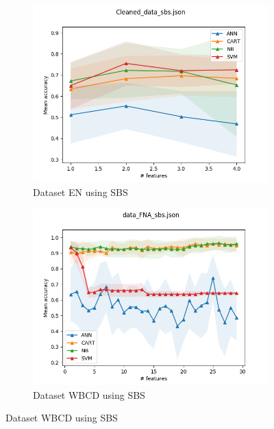 \begin{figure}[htbp!]
  \centering
  \begin{subfigure}[b]{0.475\textwidth}
      \centering
      \includegraphics[width=\textwidth]{../plots_with_std_fill/Cleaned_data_sb_combined.png}
      \caption[]%
      {{\small Dataset EN using SBS}}
      \label{fig:EN_sbs}
  \end{subfigure}
  \hfill
  \begin{subfigure}[b]{0.475\textwidth}
      \centering
      \includegraphics[width=\textwidth]{../plots_with_std_fill/data_FNA_sb_combined.png}
      \caption[]%
      {{\small Dataset WBCD using SBS}}
      \label{fig:WBCD_sbs}
  \end{subfigure}

\end{figure}
